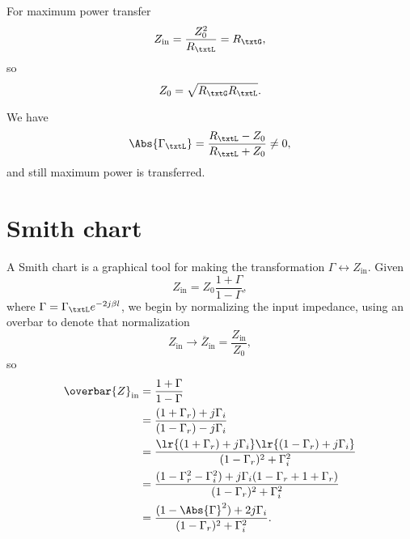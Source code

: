 For maximum power transfer
\begin{equation}\label{eqn:uwavesDeck5SmithChartCore:300}
Z_{\textrm{in}} = \frac{Z_0^2}{R_\txtL} = R_\txtG,
\end{equation}
so
\begin{equation}\label{eqn:uwavesDeck5SmithChartCore:320}
Z_0 = \sqrt{ R_\txtG R_\txtL }.
\end{equation}

We have
\begin{equation}\label{eqn:uwavesDeck5SmithChartCore:340}
\Abs{\Gamma_\txtL} = \frac{ R_\txtL - Z_0 }{R_\txtL + Z_0} \ne 0,
\end{equation}
and still maximum power is transferred.

\section{Smith chart}
A Smith chart is a graphical tool for making the transformation \( \Gamma \leftrightarrow Z_{\textrm{in}} \).  Given
\begin{equation}\label{eqn:uwavesDeck5SmithChartCore:360}
Z_{\textrm{in}} = Z_0 \frac{ 1 + \Gamma }{ 1 - \Gamma },
\end{equation}
where \( \Gamma = \Gamma_\txtL e^{- 2 j \beta l } \), we begin by normalizing the input impedance, using an overbar to denote that normalization
\begin{equation}\label{eqn:uwavesDeck5SmithChartCore:380}
Z_{\textrm{in}} \rightarrow \overbar{Z}_{\textrm{in}} = \frac{Z_{\textrm{in}}}{Z_0},
\end{equation}
so
\begin{equation}\label{eqn:uwavesDeck5SmithChartCore:400}
\begin{aligned}
\overbar{Z}_{\textrm{in}}
&= \frac{ 1 + \Gamma }{ 1 - \Gamma }
\\ &= \frac{ (1 + \Gamma_r) + j \Gamma_i }{ (1 - \Gamma_r) - j \Gamma_i }
\\ &= \frac{ \lr{ (1 + \Gamma_r) + j \Gamma_i}\lr{(1 - \Gamma_r) + j \Gamma_i} }{ (1 - \Gamma_r)^2 + \Gamma_i^2 }
\\ &= \frac{ (1 - \Gamma_r^2 - \Gamma_i^2) + j \Gamma_i (1 - \Gamma_r + 1 + \Gamma_r ) }{ (1 - \Gamma_r)^2 + \Gamma_i^2 }
\\ &= \frac{ (1 - \Abs{\Gamma}^2) + 2 j \Gamma_i }{ (1 - \Gamma_r)^2 + \Gamma_i^2 }.
\end{aligned}
\end{equation}

